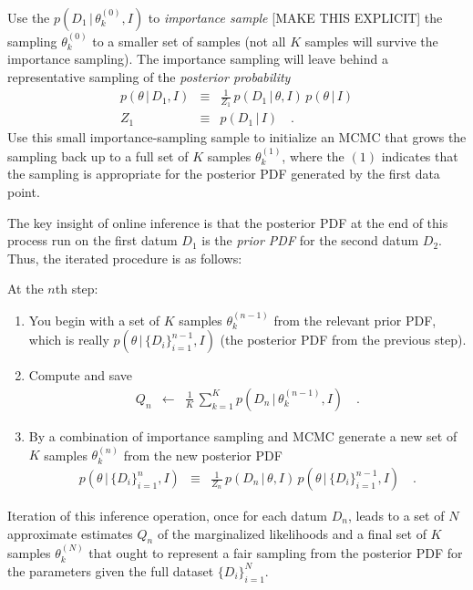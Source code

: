 \documentclass[12pt]{article}
\newcommand{\given}{\,|\,}
\newcommand{\info}{I}
\newcommand{\pars}{\theta}
\newcommand{\sample}[2]{\pars^{({#1})}_{#2}}
\newcommand{\datum}[1]{D_{#1}}
\newcommand{\dataset}[1]{\{D_i\}_{i=1}^{#1}}
\begin{document}
Use the $p(\datum{1}\given\sample{0}{k},\info)$ to \emph{importance
  sample} [MAKE THIS EXPLICIT] the sampling $\sample{0}{k}$ to a
smaller set of samples (not all $K$ samples will survive the
importance sampling).  The importance sampling will leave behind a
representative sampling of the \emph{posterior probability}
\begin{eqnarray}\displaystyle
p(\pars\given\datum{1},\info) &\equiv& \frac{1}{Z_1}\,p(\datum{1}\given\pars,\info)\,p(\pars\given\info)
\\
Z_1 &\equiv& p(\datum{1}\given\info)
\quad .
\end{eqnarray}
Use this small importance-sampling sample to initialize an MCMC that
grows the sampling back up to a full set of $K$ samples
$\sample{1}{k}$, where the $(1)$ indicates that the sampling is
appropriate for the posterior PDF generated by the first data point.

The key insight of online inference is that the posterior PDF at the
end of this process run on the first datum $\datum{1}$ is the
\emph{prior PDF} for the second datum $\datum{2}$.  Thus, the iterated
procedure is as follows:

At the $n$th step:
\begin{enumerate}
\item You begin with a set of $K$ samples $\sample{n-1}{k}$ from the
  relevant prior PDF, which is really
  $p(\pars\given\dataset{n-1},\info)$ (the posterior PDF from the
  previous step).
\item Compute and save
  \begin{eqnarray}\displaystyle
    Q_n &\leftarrow& \frac{1}{K}\,\sum_{k=1}^K p(\datum{n}\given\sample{n-1}{k},\info)
    \quad .
  \end{eqnarray}
\item By a combination of importance sampling and MCMC generate a new
  set of $K$ samples $\sample{n}{k}$ from the new posterior PDF
  \begin{eqnarray}\displaystyle
    p(\pars\given\dataset{n},\info) &\equiv& \frac{1}{Z_n}\,p(\datum{n}\given\pars,\info)\,p(\pars\given\dataset{n-1},\info)
  \quad .
  \end{eqnarray}
\end{enumerate}
Iteration of this inference operation, once for each datum $\datum{n}$,
leads to a set of $N$ approximate estimates $Q_n$ of the marginalized
likelihoods and a final set of $K$ samples $\sample{N}{k}$ that ought
to represent a fair sampling from the posterior PDF for the parameters
given the full dataset $\dataset{N}$.
\end{document}
